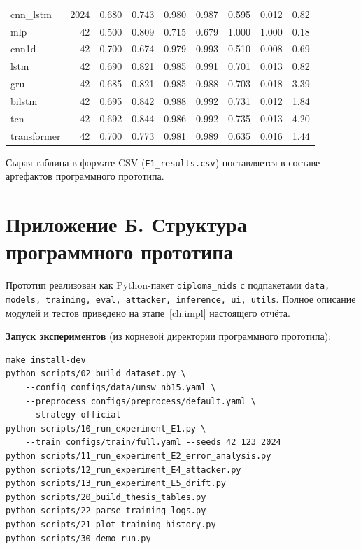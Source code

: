 {\begin{longtable}{@{}lrrrrrrrr@{}}
cnn\_lstm            & 2024 & 0.680 & 0.743 & 0.980 & 0.987 & 0.595 & 0.012 & 0.82  \\
mlp                  & 42   & 0.500 & 0.809 & 0.715 & 0.679 & 1.000 & 1.000 & 0.18  \\
cnn1d                & 42   & 0.700 & 0.674 & 0.979 & 0.993 & 0.510 & 0.008 & 0.69  \\
lstm                 & 42   & 0.690 & 0.821 & 0.985 & 0.991 & 0.701 & 0.013 & 0.82  \\
gru                  & 42   & 0.685 & 0.821 & 0.985 & 0.988 & 0.703 & 0.018 & 3.39  \\
bilstm               & 42   & 0.695 & 0.842 & 0.988 & 0.992 & 0.731 & 0.012 & 1.84  \\
tcn                  & 42   & 0.692 & 0.844 & 0.986 & 0.992 & 0.735 & 0.013 & 4.20  \\
transformer          & 42   & 0.700 & 0.773 & 0.981 & 0.989 & 0.635 & 0.016 & 1.44  \\
\end{longtable}
}

\noindent
Сырая таблица в формате CSV (\verb|E1_results.csv|) поставляется в
составе артефактов программного прототипа.

\section*{Приложение Б. Структура программного прототипа}
\label{app:project}

Прототип реализован как Python-пакет \texttt{diploma\_nids} с
подпакетами \texttt{data, models, training, eval, attacker, inference,
ui, utils}. Полное описание модулей и тестов приведено на
этапе~\ref{ch:impl} настоящего отчёта.

\textbf{Запуск экспериментов} (из корневой директории программного
прототипа):

\begin{verbatim}
make install-dev
python scripts/02_build_dataset.py \
    --config configs/data/unsw_nb15.yaml \
    --preprocess configs/preprocess/default.yaml \
    --strategy official
python scripts/10_run_experiment_E1.py \
    --train configs/train/full.yaml --seeds 42 123 2024
python scripts/11_run_experiment_E2_error_analysis.py
python scripts/12_run_experiment_E4_attacker.py
python scripts/13_run_experiment_E5_drift.py
python scripts/20_build_thesis_tables.py
python scripts/22_parse_training_logs.py
python scripts/21_plot_training_history.py
python scripts/30_demo_run.py
\end{verbatim}

